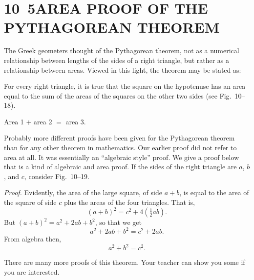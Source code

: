 \documentclass[11pt]{book}
\theoremstyle{bkplain}
\theoremstyle{XIplainnote}
\theoremstyle{bkplain}
\theoremstyle{bkplain}
\begin{document}
\section*{10--5\quad AREA PROOF OF THE\\PYTHAGOREAN THEOREM}

The Greek geometers thought of the Pythagorean theorem, not as a numerical
relationship between lengths of the sides of a right triangle, but rather as a
relationship between areas. Viewed in this light, the theorem may be stated as:

\begin{theorem}
For every right triangle, it is true that the square on the hypotenuse has
an area equal to the sum of the areas of the squares on the other two sides
(see Fig.~10--18).
\end{theorem}

\FIGXEIGHTEENNINETEEN

\begin{center}
Area 1 $+$ area 2 $=$ area 3.
\end{center}

Probably more different proofs have been given for the Pythagorean theorem than
for any other theorem in mathematics. Our earlier proof did not refer to area
at all. It was essentially an ``algebraic style'' proof. We give a proof below
that is a kind of algebraic and area proof. If the sides of the right triangle
are $a$, $b$, and $c$, consider Fig.~10--19.

\noindent\emph{Proof.} Evidently, the area of the large square, of side
$a + b$, is equal to the area of the square of side $c$ plus the areas of the
four triangles. That is,
\[ (a + b)^2 = c^2 + 4(\tfrac{1}{2}ab). \]
But $(a + b)^2 = a^2 + 2ab + b^2$, so that we get
\[ a^2 + 2ab + b^2 = c^2 + 2ab. \]
From algebra then,
\[ a^2 + b^2 = c^2. \]

There are many more proofs of this theorem. Your teacher can show you some if
you are interested.
\end{document}
